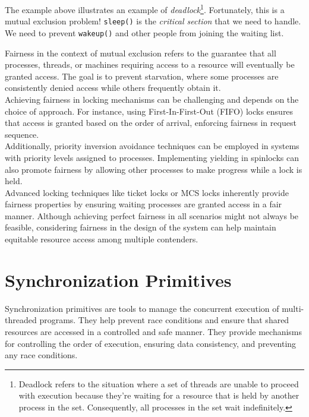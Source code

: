 \documentclass{report}
\newcommand{\corollaryBegin}[1]{\begin{tcolorbox}[colback=teal!5!white,colframe=black!75!teal,title={Corollary:
      #1}]}
\newcommand{\corollaryEnd}{\end{tcolorbox}}
\begin{document}
The example above illustrates an example of \textit{deadlock}\footnote{Deadlock refers to the
  situation where a set of threads are unable to proceed with execution because they're waiting for
  a resource that is held by another process in the set. Consequently, all processes in the set wait
  indefinitely.}. Fortunately, this is a mutual exclusion problem! \texttt{sleep()} is the
\textit{critical section} that we need to handle. We need to prevent \texttt{wakeup()} and other
people from joining the waiting list.

\corollaryBegin{Fairness}
Fairness in the context of mutual exclusion refers to the guarantee that all processes, threads, or
machines requiring access to a resource will eventually be granted access. The goal is to prevent
starvation, where some processes are consistently denied access while others frequently obtain it. \\

Achieving fairness in locking mechanisms can be challenging and depends on the choice of
approach. For instance, using First-In-First-Out (FIFO) locks ensures that access is granted based
on the order of arrival, enforcing fairness in request sequence. \\

Additionally, priority inversion avoidance techniques can be employed in systems with priority
levels assigned to processes. Implementing yielding in spinlocks can also promote fairness by
allowing other processes to make progress while a lock is held. \\

Advanced locking techniques like ticket locks or MCS locks inherently provide fairness properties by
ensuring waiting processes are granted access in a fair manner. Although achieving perfect fairness
in all scenarios might not always be feasible, considering fairness in the design of the system can
help maintain equitable resource access among multiple contenders. 
\corollaryEnd










\chapter{Synchronization Primitives}
Synchronization primitives are tools to manage the concurrent execution of multi-threaded
programs. They help prevent race conditions and ensure that shared resources are accessed in a
controlled and safe manner. They provide mechanisms for controlling the order of execution, ensuring
data consistency, and preventing any race conditions.
\end{document}
